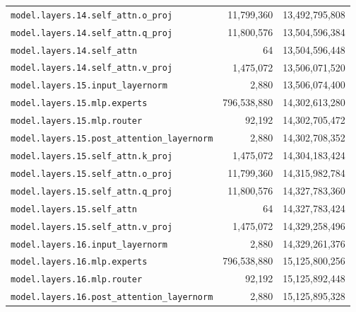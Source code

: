 \documentclass[10pt,a4paper]{article}
\theoremstyle{definition}
\begin{document}
\begin{appendices}
\begin{longtable}{p{9.5cm}rr}
\texttt{model.\allowbreak{}layers.\allowbreak{}14.\allowbreak{}self\_attn.\allowbreak{}o\_proj} & 11,799,360 & 13,492,795,808 \\
\texttt{model.\allowbreak{}layers.\allowbreak{}14.\allowbreak{}self\_attn.\allowbreak{}q\_proj} & 11,800,576 & 13,504,596,384 \\
\texttt{model.\allowbreak{}layers.\allowbreak{}14.\allowbreak{}self\_attn} & 64 & 13,504,596,448 \\
\texttt{model.\allowbreak{}layers.\allowbreak{}14.\allowbreak{}self\_attn.\allowbreak{}v\_proj} & 1,475,072 & 13,506,071,520 \\
\texttt{model.\allowbreak{}layers.\allowbreak{}15.\allowbreak{}input\_layernorm} & 2,880 & 13,506,074,400 \\
\texttt{model.\allowbreak{}layers.\allowbreak{}15.\allowbreak{}mlp.\allowbreak{}experts} & 796,538,880 & 14,302,613,280 \\
\texttt{model.\allowbreak{}layers.\allowbreak{}15.\allowbreak{}mlp.\allowbreak{}router} & 92,192 & 14,302,705,472 \\
\texttt{model.\allowbreak{}layers.\allowbreak{}15.\allowbreak{}post\_attention\_layernorm} & 2,880 & 14,302,708,352 \\
\texttt{model.\allowbreak{}layers.\allowbreak{}15.\allowbreak{}self\_attn.\allowbreak{}k\_proj} & 1,475,072 & 14,304,183,424 \\
\texttt{model.\allowbreak{}layers.\allowbreak{}15.\allowbreak{}self\_attn.\allowbreak{}o\_proj} & 11,799,360 & 14,315,982,784 \\
\texttt{model.\allowbreak{}layers.\allowbreak{}15.\allowbreak{}self\_attn.\allowbreak{}q\_proj} & 11,800,576 & 14,327,783,360 \\
\texttt{model.\allowbreak{}layers.\allowbreak{}15.\allowbreak{}self\_attn} & 64 & 14,327,783,424 \\
\texttt{model.\allowbreak{}layers.\allowbreak{}15.\allowbreak{}self\_attn.\allowbreak{}v\_proj} & 1,475,072 & 14,329,258,496 \\
\texttt{model.\allowbreak{}layers.\allowbreak{}16.\allowbreak{}input\_layernorm} & 2,880 & 14,329,261,376 \\
\texttt{model.\allowbreak{}layers.\allowbreak{}16.\allowbreak{}mlp.\allowbreak{}experts} & 796,538,880 & 15,125,800,256 \\
\texttt{model.\allowbreak{}layers.\allowbreak{}16.\allowbreak{}mlp.\allowbreak{}router} & 92,192 & 15,125,892,448 \\
\texttt{model.\allowbreak{}layers.\allowbreak{}16.\allowbreak{}post\_attention\_layernorm} & 2,880 & 15,125,895,328 \\

\end{longtable}
\end{appendices}
\end{document}
